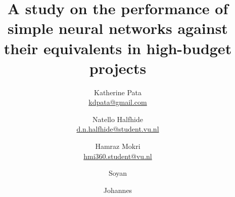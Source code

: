 \documentclass[11pt, a4paper]{article}
\begin{document}
\title{A study on the performance of simple neural networks against their equivalents in high-budget projects}
\author{
  Katherine Pata \\ \href{mailto:kdpata@gmail.com}{kdpata@gmail.com}
  \and Natello Halfhide \\ \href{mailto:d.n.halfhide@student.vu.nl}{d.n.halfhide@student.vu.nl}
  \and Hamraz Mokri \\ \href{mailto:hmi360.student@vu.nl}{hmi360.student@vu.nl}
  \and Soyan \\ \href{mailto:}{}
  \and Johannes \\ \href{mailto:}{}
}
\maketitle

\newpage

\tableofcontents

\newpage
\restoregeometry

\twocolumn










\newpage
\onecolumn
\appendix
\end{document}
